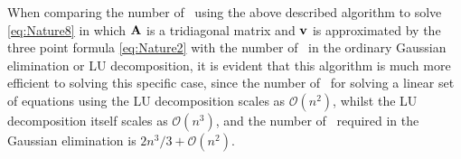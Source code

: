 When comparing the number of \flops \, using the above described algorithm to solve \eqref{eq:Nature8} in which $\mbox{\textbf{A}}$ is a tridiagonal matrix and $\mbox{\textbf{v}}$ is approximated by the three point formula \eqref{eq:Nature2} with the number of \flops \, in the ordinary Gaussian elimination or LU decomposition, it is evident that this algorithm is much more efficient to solving this specific case, since the number of \flops \, for solving a linear set of equations using the LU decomposition scales as $\mathcal{O}(n^2)$, whilst the LU decomposition itself scales as $\mathcal{O}(n^3)$, and the number of \flops \, required in the Gaussian elimination is $2n^3 /3 +\mathcal{O}(n^2)$. \cite[173]{CompLectureNotes}



